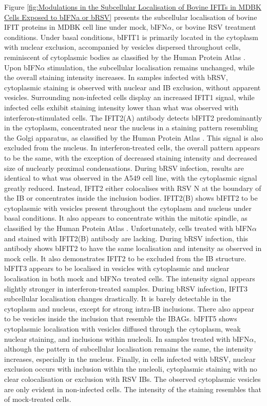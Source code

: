 Figure \ref{fig:Modulations in the Subcellular Localisation of Bovine IFITs in MDBK Cells Exposed to bIFNa or bRSV} presents the subcellular localisation of bovine IFIT proteins in MDBK cell line under mock, bIFN\(\alpha\), or bovine RSV treatment conditions. Under basal conditions, bIFIT1 is primarily located in the cytoplasm with nuclear exclusion, accompanied by vesicles dispersed throughout cells, reminiscent of cytoplasmic bodies as classified by the Human Protein Atlas \cite{Thul2017AProteome}. Upon bIFN\(\alpha\) stimulation, the subcellular localisation remains unchanged, while the overall staining intensity increases. In samples infected with bRSV, cytoplasmic staining is observed with nuclear and IB exclusion, without apparent vesicles. Surrounding non-infected cells display an increased IFIT1 signal, while infected cells exhibit staining intensity lower than what was observed with interferon-stimulated cells. The IFIT2(A) antibody detects bIFIT2 predominantly in the cytoplasm, concentrated near the nucleus in a staining pattern resembling the Golgi apparatus, as classified by the Human Protein Atlas \cite{Thul2017AProteome}. This signal is also excluded from the nucleus. In interferon-treated cells, the overall pattern appears to be the same, with the exception of decreased staining intensity and decreased size of nuclearly proximal condensations. During bRSV infection, results are identical to what was observed in the A549 cell line, with the cytoplasmic signal greatly reduced. Instead, IFIT2 either colocalises with RSV N at the boundary of the IB or concentrates inside the inclusion bodies. IFIT2(B) shows bIFIT2 to be cytoplasmic with vesicles present throughout the cytoplasm and nucleus under basal conditions. It also appears to concentrate within the mitotic spindle, as classified by the Human Protein Atlas \cite{Thul2017AProteome}. Unfortunately, cells treated with bIFN\(\alpha\) and stained with IFIT2(B) antibody are lacking. During bRSV infection, this antibody shows bIFIT2 to have the same localisation and intensity as observed in mock cells. It also demonstrates IFIT2 to be excluded from the IB structure. bIFIT3 appears to be localised in vesicles with cytoplasmic and nuclear localisation in both mock and bIFN\(\alpha\) treated cells. The intensity signal appears slightly stronger in interferon-treated samples. During bRSV infection, IFIT3 subcellular localisation changes drastically. It is barely detectable in the cytoplasm and nucleus, except for strong intra-IB inclusions. There also appear to be vesicles inside the inclusion that resemble the IBAGs. bIFIT5 shows cytoplasmic localisation with vesicles diffused through the cytoplasm, weak nuclear staining, and inclusions within nucleoli. In samples treated with bIFN\(\alpha\), although the pattern of subcellular localisation remains the same, the intensity increases, especially in the nucleus. Finally, in cells infected with bRSV, nuclear exclusion occurs with inclusion within the nucleoli, cytoplasmic staining with no clear colocalisation or exclusion with RSV IBs. The observed cytoplasmic vesicles are only evident in non-infected cells. The intensity of the staining resembles that of mock-treated cells.

